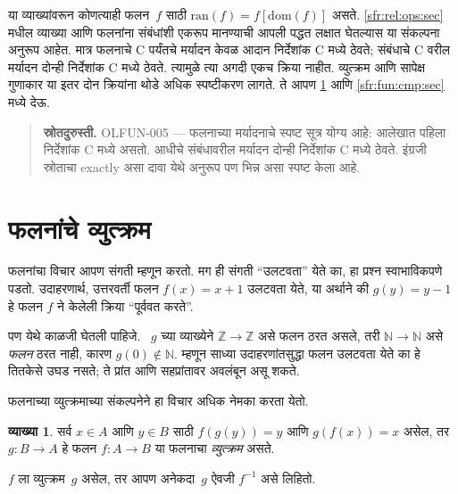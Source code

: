 \documentclass[11pt,a4paper,openany]{book}
\theoremstyle{definition}
\newtheorem{defn}{व्याख्या}[section]
\newenvironment{explain}{}{}
\newcommand{\Nat}{\mathbb{N}}
\newcommand{\Int}{\mathbb{Z}}
\newcommand{\funimage}[2]{#1[#2]}
\newcommand{\dom}[1]{\mathrm{dom}(#1)}
\newcommand{\ran}[1]{\mathrm{ran}(#1)}
\begin{document}
\begin{explain}
या व्याख्यांवरून कोणत्याही फलन~$f$ साठी $\ran{f} =
\funimage{f}{\dom{f}}$ असते.
\ref{sfr:rel:ops:sec} मधील
व्याख्या आणि फलनांना संबंधांशी एकरूप मानण्याची आपली पद्धत लक्षात
घेतल्यास या संकल्पना अनुरूप आहेत. मात्र फलनाचे C पर्यंतचे मर्यादन
केवळ आदान निर्देशांक C मध्ये ठेवते; संबंधाचे C वरील मर्यादन
दोन्ही निर्देशांक C मध्ये ठेवते. त्यामुळे त्या अगदी एकच क्रिया नाहीत.
व्युत्क्रम आणि सापेक्ष गुणाकार या इतर दोन क्रियांना थोडे अधिक
स्पष्टीकरण लागते. ते आपण
\ref{sfr:fun:inv:sec} आणि \ref{sfr:fun:cmp:sec} मध्ये देऊ.
\end{explain}
\begin{quote}\small\textbf{स्रोतदुरुस्ती.} OLFUN-005 — फलनाच्या मर्यादनाचे स्पष्ट सूत्र योग्य आहे: आलेखात पहिला निर्देशांक C मध्ये असतो. आधीचे संबंधावरील मर्यादन दोन्ही निर्देशांक C मध्ये ठेवते. इंग्रजी स्रोताचा exactly असा दावा येथे अनुरूप पण भिन्न असा स्पष्ट केला आहे.\end{quote}








\section{फलनांचे व्युत्क्रम}\label{sfr:fun:inv:sec}

\begin{explain}
फलनांचा विचार आपण संगती म्हणून करतो. मग ही संगती ``उलटवता'' येते का,
हा प्रश्न स्वाभाविकपणे पडतो. उदाहरणार्थ, उत्तरवर्ती फलन $f(x) = x + 1$
उलटवता येते, या अर्थाने की $g(y) = y - 1$ हे फलन $f$ ने केलेली
क्रिया ``पूर्ववत करते''.

पण येथे काळजी घेतली पाहिजे. ~$g$ च्या व्याख्येने $\Int \to \Int$
असे फलन ठरत असले, तरी $\Nat \to \Nat$ असे \emph{फलन} ठरत नाही,
कारण $g(0) \notin \Nat$. म्हणून साध्या उदाहरणांतसुद्धा फलन उलटवता
येते का हे तितकेसे उघड नसते; ते प्रांत आणि सहप्रांतावर अवलंबून असू शकते.

फलनाच्या व्युत्क्रमाच्या संकल्पनेने हा विचार अधिक नेमका करता येतो.
\end{explain}

\begin{defn}
सर्व $x \in A$ आणि $y \in B$ साठी $f(g(y)) = y$ आणि $g(f(x)) = x$
असेल, तर $g \colon B \to A$ हे फलन $f \colon A \to B$ या फलनाचा
\emph{व्युत्क्रम} असते.
\end{defn}

$f$ ला व्युत्क्रम~$g$ असेल, तर आपण अनेकदा~$g$ ऐवजी $f^{-1}$ असे लिहितो.
\end{document}
